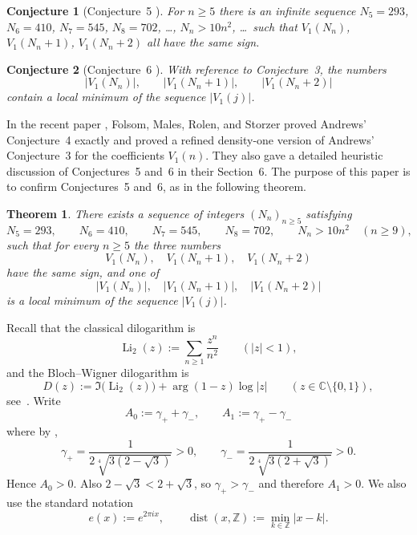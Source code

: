 \documentclass[reqno]{amsart}
\theoremstyle{definition}
\theoremstyle{plain}
\newtheorem{theorem}    {Theorem}
\newtheorem*{aconjecture}{Conjecture}
\theoremstyle{remark}
\numberwithin{equation}{section}
\newcommand{\Z}{\mathbb{Z}}
\newcommand{\dist}{\operatorname{dist}}
\begin{document}
\begin{aconjecture}[Conjecture~5 \cite{Andrews86}]
For $n\ge 5$ there is an infinite sequence $N_5=293$, $N_6=410$, $N_7=545$, $N_8=702$, \ldots, $N_n>10n^2$, \ldots\ such that $V_1(N_n)$, $V_1(N_n+1)$, $V_1(N_n+2)$ all have the same sign.
\end{aconjecture}

\begin{aconjecture}[Conjecture~6 \cite{Andrews86}]
With reference to Conjecture~3, the numbers
\[
  |V_1(N_n)|,\qquad |V_1(N_n+1)|,\qquad |V_1(N_n+2)|
\]
contain a local minimum of the sequence $|V_1(j)|$.
\end{aconjecture}

In the recent paper \cite[Theorem~1.1 and the following remark]{FMRS}, Folsom, Males, Rolen, and Storzer proved Andrews' Conjecture~4 
exactly and proved a refined density-one version of Andrews' Conjecture~3 for the coefficients $V_1(n)$. 
They also gave a detailed heuristic discussion of Conjectures~5 and~6 in their Section~6.
The purpose of this paper is to confirm Conjectures~5 and~6, as in the following theorem.

\begin{theorem}\label{thm:main}
There exists a sequence of integers $(N_n)_{n\ge 5}$ satisfying
\[
  N_5=293,\qquad N_6=410,\qquad N_7=545,\qquad N_8=702,\qquad N_n>10n^2\quad (n\ge 9),
\]
such that for every $n\ge 5$ the three numbers
\[
  V_1(N_n),\quad V_1(N_n+1),\quad V_1(N_n+2)
\]
have the same sign, and one of
\[
  |V_1(N_n)|,\quad |V_1(N_n+1)|,\quad |V_1(N_n+2)|
\]
is a local minimum of the sequence $|V_1(j)|$.
\end{theorem}

Recall that the classical dilogarithm is
\[
  \operatorname{Li}_2(z):=\sum_{n\ge 1}\frac{z^n}{n^2}
  \qquad (|z|<1),
\]
and the Bloch--Wigner dilogarithm is
\[
  D(z):=\Im\bigl(\operatorname{Li}_2(z)\bigr)+\arg(1-z)\log|z|
  \qquad (z\in \mathbb{C}\setminus\{0,1\}),
\]
see~\cite[Chapter I]{ZagierDilog}.
Write
\begin{equation}\label{eq:constants}
  A_0:=\gamma_+ + \gamma_-,
  \qquad
  A_1:=\gamma_+ - \gamma_-
\end{equation}
where by \cite[Theorem~1.2(3)]{FMRS},
\begin{equation}\label{eq:gammas}
  \gamma_+=\frac{1}{2\sqrt[4]{3(2-\sqrt 3)}}>0,
  \qquad
  \gamma_-=\frac{1}{2\sqrt[4]{3(2+\sqrt 3)}}>0.
\end{equation}
Hence $A_0>0$. Also $2-\sqrt 3<2+\sqrt 3$, so $\gamma_+>\gamma_-$ and therefore $A_1>0$.
We also use the standard notation
\[
  e(x):=e^{2\pi i x},
  \qquad
  \dist(x,\Z):=\min_{k\in \Z}|x-k|.
\]
\end{document}
